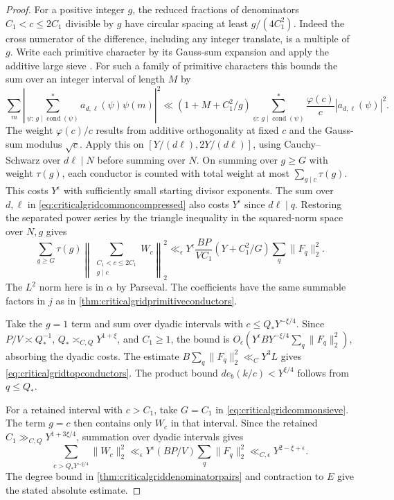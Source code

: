 \documentclass[11pt,a4paper]{article}
\numberwithin{equation}{section}
\begin{document}
\begin{proof}
For a positive integer $g$, the reduced fractions of denominators
$C_1<c\le2C_1$ divisible by $g$ have circular spacing at least
$g/(4C_1^2)$. Indeed the cross numerator of the difference,
including any integer translate, is a multiple of $g$.
Write each primitive character by its Gauss-sum expansion and
apply the additive large sieve \cite{MontgomeryVaughanSieve}.
For such a family of primitive characters this bounds
the sum over an integer interval of length $M$ by
\[
 \sum_m\left|\sum_{\psi:\,g\mid \operatorname{cond}(\psi)}
                     ^* a_{d,\ell}(\psi)\psi(m)\right|^2
 \ll (1+M+C_1^2/g)
      \sum_{\psi:\,g\mid\operatorname{cond}(\psi)}^*
         \frac{\varphi(c)}{c}|a_{d,\ell}(\psi)|^2 .
\]
The weight $\varphi(c)/c$ results from additive orthogonality
at fixed $c$ and the Gauss-sum modulus $\sqrt c$.
Apply this on $[Y/(d\ell),2Y/(d\ell)]$, using
Cauchy--Schwarz over $d\ell\mid N$ before summing over $N$.
On summing over $g\ge G$ with weight $\tau(g)$, each conductor
is counted with total weight at most $\sum_{g\mid c}\tau(g)$.
This costs $Y^\epsilon$ with sufficiently small starting
divisor exponents. The sum over $d,\ell$ in
\cref{eq:criticalgridcommoncompressed} also costs $Y^\epsilon$
since $d\ell\mid q$. Restoring the separated power series
by the triangle inequality in the squared-norm space over
$N,g$ gives
\begin{equation}
 \sum_{g\ge G}\tau(g)
       \left\|\sum_{\substack{C_1<c\le2C_1\\g\mid c}}W_c\right\|_2^2
 \ll_\epsilon
 Y^\epsilon\frac{BP}{V C_1}(Y+C_1^2/G)\sum_q\|F_q\|_2^2.
 \label{eq:criticalgridcommonsieve}
\end{equation}
The $L^2$ norm here is in $\alpha$ by Parseval. The
coefficients have the same summable factors in $j$ as
in \cref{thm:criticalgridprimitiveconductors}.

Take the $g=1$ term and sum over dyadic intervals with
$c\le Q_*Y^{-\xi/4}$. Since $P/V\asymp Q_*^{-1}$,
$Q_*\asymp_{C,Q}Y^{1+\xi}$, and $C_1\ge1$, the bound is
$O_\epsilon(Y^\epsilon B Y^{-\xi/4}\sum_q\|F_q\|_2^2)$,
absorbing the dyadic costs. The estimate
$B\sum_q\|F_q\|_2^2\ll_C Y^3L$ gives
\cref{eq:criticalgridtopconductors}.
The product bound $d e_b(k/c)<Y^{\xi/4}$ follows from
$q\le Q_*$.

For a retained interval with $c>C_1$, take $G=C_1$ in
\cref{eq:criticalgridcommonsieve}. The term $g=c$ then
contains only $W_c$ in that interval. Since the retained
$C_1\gg_{C,Q}Y^{1+3\xi/4}$, summation over dyadic
intervals gives
\[
 \sum_{c>Q_*Y^{-\xi/4}}\|W_c\|_2^2
 \ll_\epsilon Y^\epsilon (BP/V)\sum_q\|F_q\|_2^2
 \ll_{C,\epsilon}Y^{2-\xi+\epsilon}.
\]
The degree bound in \cref{thm:criticalgriddenominatorpairs}
and contraction to $E$ give the stated absolute estimate.


\end{proof}
\end{document}
